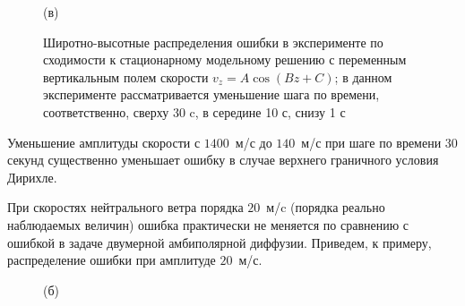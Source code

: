 \documentclass[14pt, a4paper]{extarticle}
\begin{document}
\begin{figure}[H]

(в)

\caption{Широтно-высотные распределения ошибки в эксперименте по сходимости к стационарному модельному решению с переменным вертикальным полем скорости  $v_z = A\cos(Bz+C)$; в данном эксперименте рассматривается уменьшение шага по времени, соответственно, сверху 30 c, в середине 10 с, снизу 1 с}
\end{figure}


Уменьшение амплитуды скорости с $1400$~м/с до $140$~м/с при шаге по времени $30$ секунд существенно уменьшает ошибку в случае верхнего граничного условия Дирихле.


При скоростях нейтрального ветра порядка $20$~м/c (порядка реально наблюдаемых величин) ошибка практически не меняется по сравнению с ошибкой в задаче двумерной амбиполярной диффузии. Приведем, к примеру, распределение ошибки при амплитуде $20$~м/с.

\begin{figure}[H]

(б)

\end{figure}
\end{document}
